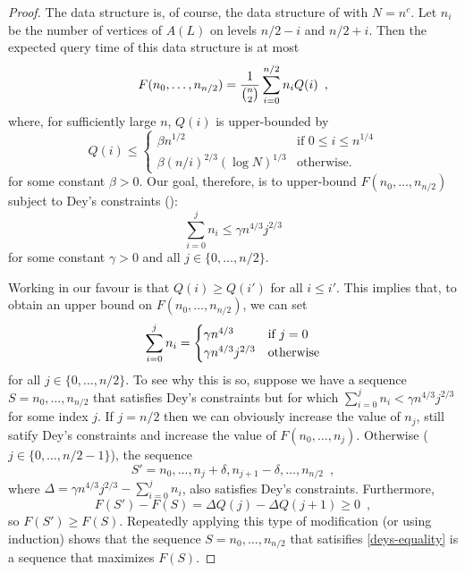 \documentclass{cccg12}
\begin{document}
\begin{proof}
  The data structure is, of course, the data structure of
   with $N=n^c$.  Let $n_i$ be the number of vertices
  of $A(L)$ on levels $n/2-i$ and $n/2+i$.  Then the expected query time
  of this data structure is at most
  \begin{equation}
    F(n_0,\ldots,n_{n/2}) 
      = \frac{1}{\binom{n}{2}}\sum_{i=0}^{n/2} n_i Q(i) \enspace ,
     \eqlabel{expected}
  \end{equation}
  where, for sufficiently large $n$, $Q(i)$ is upper-bounded by
  \[
        Q(i) \le \begin{cases}
          \beta n^{1/2} & \text{if $0\le i \le n^{1/4}$} \\
          \beta (n/i)^{2/3}(\log N)^{1/3}  & \text{otherwise} .
        \end{cases}
  \]
  for some constant $\beta>0$.   Our goal, therefore, is to upper-bound
  $F(n_0,\ldots,n_{n/2})$ subject to Dey's constraints ():
  \[
     \sum_{i=0}^{j}n_i \le \gamma n^{4/3}j^{2/3} 
  \]
  for some constant $\gamma>0$ and all $j\in\{0,\ldots,n/2\}$.

  Working in our favour is that $Q(i) \ge Q(i')$ for all $i \le i'$.
  This implies that, to obtain an upper bound on $F(n_0,\ldots,n_{n/2})$,
  we can set
  \begin{equation}
      \sum_{i=0}^{j}n_i = 
        \begin{cases}
           \gamma n^{4/3} & \text{if $j=0$} \\
           \gamma n^{4/3}j^{2/3} & \text{otherwise}
        \end{cases}  \eqlabel{deys-equality}
  \end{equation}
  for all $j\in\{0,\ldots,n/2\}$.  To see why this is so, suppose we have
  a sequence $S=n_0,\ldots,n_{n/2}$ that satisfies Dey's constraints
  but for which $\sum_{i=0}^{j}n_i < \gamma n^{4/3}j^{2/3}$ for some index
  $j$. If $j=n/2$ then we can obviously increase the value of $n_j$, still
  satify Dey's constraints and increase the value of $F(n_0,\ldots,n_j)$.
  Otherwise ($j\in\{0,\ldots,n/2-1\}$), the sequence
  \[
     S'=n_0,\ldots,n_{j}+\delta,n_{j+1}-\delta,\ldots,n_{n/2} \enspace ,
  \]
  where $\Delta=\gamma n^{4/3}j^{2/3}-\sum_{i=0}^{j}n_i$, also satisfies
  Dey's constraints.  Furthermore, 
  \[  F(S')-F(S) = \Delta Q(j) - \Delta Q(j+1) \ge 0 \enspace , \]
  so $F(S')\ge F(S)$.  Repeatedly applying this type of modification (or
  using induction) shows that the sequence $S=n_0,\ldots,n_{n/2}$ that
  satisifies \eqref{deys-equality} is a sequence that maximizes $F(S)$.


\end{proof}
\end{document}
